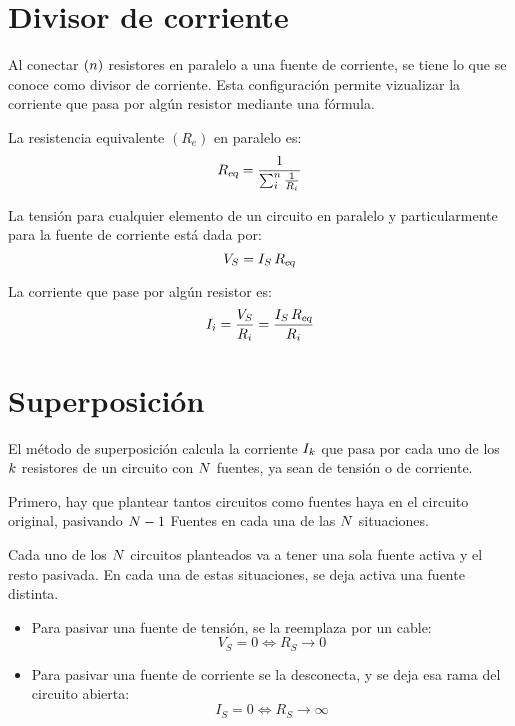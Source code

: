 \section{Divisor de corriente}

Al conectar $(n)$ resistores en paralelo a una fuente de corriente, se tiene lo que se conoce como divisor de corriente.
Esta configuración permite vizualizar la corriente que pasa por algún resistor mediante una fórmula.

\begin{center}
    \def\svgwidth{0.5\linewidth}
    
\end{center}

La resistencia equivalente $(R_e)$ en paralelo es:
\begin{equation*}
    {{R}_\textsl{{eq}}} = \frac{1}{\sum_i^n \frac{1}{R_i}}
\end{equation*}

La tensión para cualquier elemento de un circuito en paralelo y particularmente para la fuente de corriente está dada por:
\begin{equation*}
    V_S = I_S \, {{R}_\textsl{{eq}}}
\end{equation*}

La corriente que pase por algún resistor es:
\begin{equation*}
    I_i = \frac{V_S}{R_i} = \frac{I_S \, {{R}_\textsl{{eq}}}}{R_i}
\end{equation*}


\section{Superposición}

El método de superposición calcula la corriente $I_k$ que pasa por cada uno de los $k$ resistores de un circuito con $N$ fuentes, ya sean de tensión o de corriente.

Primero, hay que plantear tantos circuitos como fuentes haya en el circuito original, pasivando $N-1$ Fuentes en cada una de las $N$ situaciones.

Cada uno de los $N$ circuitos planteados va a tener una sola fuente activa y el resto pasivada.
En cada una de estas situaciones, se deja activa una fuente distinta.

\begin{itemize}
    \item Para pasivar una fuente de tensión, se la reemplaza por un cable:
    \begin{equation*}
        V_S = 0 \iff R_S \to 0
    \end{equation*}

    \item Para pasivar una fuente de corriente se la desconecta, y se deja esa rama del circuito abierta:
    \begin{equation*}
        I_S = 0 \iff R_S \to \infty
    \end{equation*}
\end{itemize}

